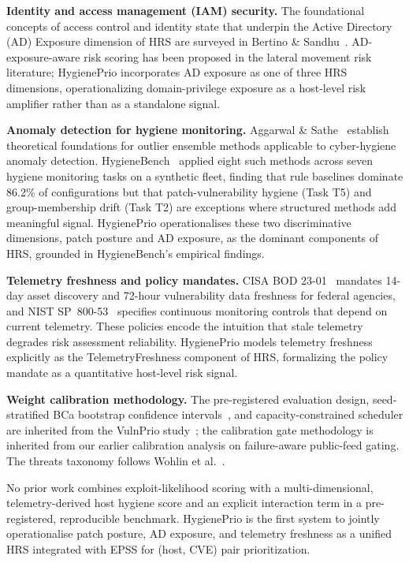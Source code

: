 \textbf{Identity and access management (IAM) security.}
The foundational concepts of access control and identity state that underpin the Active Directory (AD) Exposure dimension of HRS are surveyed in Bertino \& Sandhu~\cite{bertino2005database}. AD-exposure-aware risk scoring has been proposed in the lateral movement risk literature; HygienePrio incorporates AD exposure as one of three HRS dimensions, operationalizing domain-privilege exposure as a host-level risk amplifier rather than as a standalone signal.

\textbf{Anomaly detection for hygiene monitoring.}
Aggarwal \& Sathe~\cite{aggarwal2015outlier} establish theoretical foundations for outlier ensemble methods applicable to cyber-hygiene anomaly detection. HygieneBench~\cite{paper3hygienebench} applied eight such methods across seven hygiene monitoring tasks on a synthetic fleet, finding that rule baselines dominate 86.2\% of configurations but that patch-vulnerability hygiene (Task T5) and group-membership drift (Task T2) are exceptions where structured methods add meaningful signal. HygienePrio operationalises these two discriminative dimensions, patch posture and AD exposure, as the dominant components of HRS, grounded in HygieneBench's empirical findings.

\textbf{Telemetry freshness and policy mandates.}
CISA BOD 23-01~\cite{cisa2022bod2301} mandates 14-day asset discovery and 72-hour vulnerability data freshness for federal agencies, and NIST SP~800-53~\cite{nist2020sp80053r5} specifies continuous monitoring controls that depend on current telemetry. These policies encode the intuition that stale telemetry degrades risk assessment reliability. HygienePrio models telemetry freshness explicitly as the TelemetryFreshness component of HRS, formalizing the policy mandate as a quantitative host-level risk signal.

\textbf{Weight calibration methodology.}
The pre-registered evaluation design, seed-stratified BCa bootstrap confidence intervals~\cite{efron1994introduction}, and capacity-constrained scheduler are inherited from the VulnPrio study~\cite{paper1vulnprio}; the calibration gate methodology is inherited from our earlier calibration analysis on failure-aware public-feed gating. The threats taxonomy follows Wohlin et al.~\cite{wohlin2012experimentation}.

No prior work combines exploit-likelihood scoring with a multi-dimensional, telemetry-derived host hygiene score and an explicit interaction term in a pre-registered, reproducible benchmark. HygienePrio is the first system to jointly operationalise patch posture, AD exposure, and telemetry freshness as a unified HRS integrated with EPSS for (host, CVE) pair prioritization.
